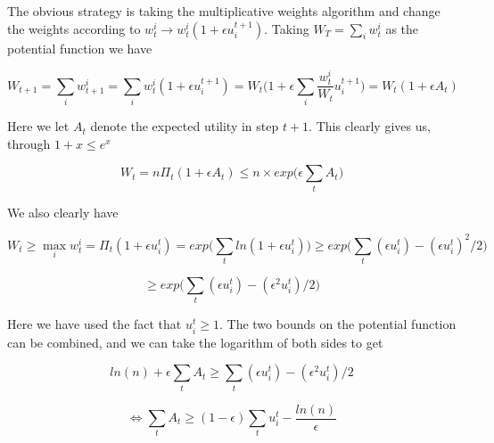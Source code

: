 The obvious strategy is taking the multiplicative weights algorithm and change the weights according to $w_t^i \rightarrow w_t^i (1 + \epsilon u_i^{t+1})$. Taking $W_T = \sum_i w_t^i$ as the potential function we have

$$
W_{t+1} = \sum_i w_{t+1}^i = \sum_i w_t^i (1 + \epsilon u_i^{t+1}) = W_t \bigg(1 + \epsilon \sum_i \frac{w_t^i}{W_t} u_i^{t+1} \bigg) = W_t (1 + \epsilon A_t)
$$

Here we let $A_t$ denote the expected utility in step $t+1$. This clearly gives us, through $1+x \le e^x$

$$
W_t = n \Pi_t (1 + \epsilon A_t) \le n \times exp \bigg( \epsilon \sum_t A_t \bigg)
$$

We also clearly have

$$
W_t \ge \max_i w_t^i = \Pi_t (1 + \epsilon u_i^t) = exp \bigg( \sum_t ln(1 + \epsilon u_i^t) \bigg) \ge exp \bigg( \sum_t (\epsilon u_i^t) - (\epsilon u_i^t)^2/2  \bigg) 
$$


$$
\ge exp \bigg( \sum_t (\epsilon u_i^t) - (\epsilon^2 u_i^t)/2  \bigg)
$$

Here we have used the fact that $u_i^t \ge 1$. The two bounds on the potential function can be combined, and we can take the logarithm of both sides to get

$$
ln(n) + \epsilon \sum_t A_t \ge \sum_t (\epsilon u_i^t) - (\epsilon^2 u_i^t)/2
$$

$$
\iff \sum_t A_t \ge (1- \epsilon) \sum_t u_i^t - \frac{ln(n)}{\epsilon}
$$
